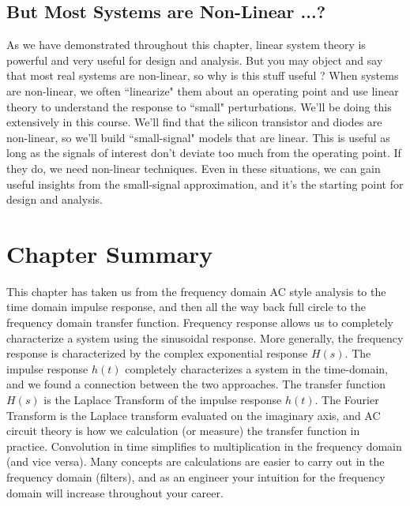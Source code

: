 \subsection{But Most Systems are Non-Linear ...?}
As we have demonstrated throughout this chapter, linear system theory is powerful and very useful for design and analysis.  But you may object and say that most real systems are non-linear, so why is this stuff useful ?
When systems are non-linear, we often ``linearize" them about an operating point and use linear theory to understand the response to ``small" perturbations.  We'll be doing this extensively in this course. We'll find that the silicon transistor and diodes are non-linear, so we'll build ``small-signal" models that are linear.  This is useful as long as the signals of interest don't deviate too much from the operating point.  If they do, we need non-linear techniques.  Even in these situations,  we can gain useful insights from the small-signal approximation, and it's the starting point for design and analysis.
\section{Chapter Summary}
This chapter has taken us from the frequency domain AC style analysis to the time domain impulse response, and then all the way back full circle to the frequency domain transfer function.
 Frequency response allows us to completely characterize a system using the sinusoidal response.
 More generally, the frequency response is characterized by the complex exponential response $H(s)$.   The impulse response $h(t)$ completely characterizes a system in the time-domain, and we found a connection between the two approaches.   The transfer function $H(s)$ is the Laplace Transform of the impulse response $h(t)$.  The Fourier Transform is the Laplace transform evaluated on the imaginary axis, and AC circuit theory is how we calculation (or measure) the transfer function in practice.   Convolution in time simplifies to multiplication in the frequency domain (and vice versa).
 Many concepts are calculations are easier to carry out in the frequency domain (filters), and as an engineer your intuition for the frequency domain will increase throughout your career.